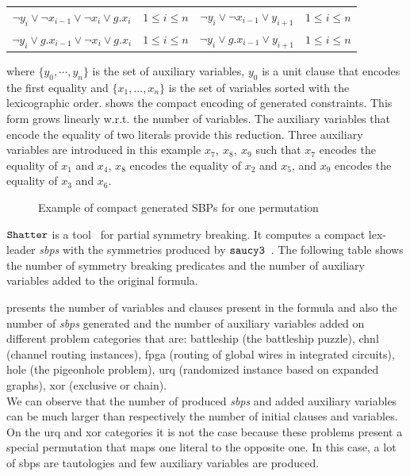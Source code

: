  
\begin{center}
\begin{tabular}{cc|cc}
 $\neg y_i \lor \neg x_{i-1} \lor \neg x_i \lor g.x_i$ & $1 \leq i \leq n$ & $ \neg y_i \lor \neg x_{i-1} \lor y_{i+1}$ & $1 \leq i \leq n$ \\
 $\neg y_i \lor  g.x_{i-1} \lor \neg x_i \lor g.x_i$ & $1 \leq i \leq n$ & $ \neg y_i \lor g.x_{i-1} \lor  y_{i+1}$ & $1 \leq i \leq n$ \\
 
\end{tabular}
\end{center}
where $\{y_0,\cdots, y_{n} \}$ is the set of auxiliary variables, $y_0$ is a unit clause that encodes the first equality and $\{x_1,...,x_n\}$ is the set of variables sorted with the lexicographic order.
 shows the compact encoding of generated constraints. This form grows linearly w.r.t. the number of variables.
The auxiliary variables that encode the equality of two literals provide this reduction. 
Three auxiliary variables are introduced in this example $x_7,\ x_8,\ x_9$ such that $x_7$ encodes the equality of $x_1$ and $x_4$, $x_8$ encodes the equality of $x_2$ and $x_5$, and $x_9$ encodes the equality of $x_3$ and $x_6$.
 \begin{figure}[!htbp]
 
 \caption{Example of compact generated SBPs for one permutation}
 \label{fig:esbp_compact_gen}
\end{figure}
$\texttt{Shatter}$ is a tool~\cite{aloul06} for partial symmetry breaking.
It computes a compact lex-leader \textit{sbps} with the symmetries produced by $\texttt{saucy3}$~\cite{katebi2010symmetry}.
The following table shows the number of symmetry breaking predicates and the
number of auxiliary variables added to the original formula.



 presents the number of variables and clauses present in the formula and also the  
number of \textit{sbps} generated and the number of auxiliary variables added on different problem categories that are:
battleship (the battleship puzzle), chnl (channel routing instances), fpga (routing of global wires in integrated circuits),
 hole (the pigeonhole problem), urq (randomized instance based on expanded graphs), xor (exclusive or chain).\\
We can observe that the number of produced \textit{sbps} and added auxiliary variables can be much larger than
respectively the number of initial clauses and variables. On the urq and xor categories it is not the case because
these problems present a special permutation that maps one literal to the opposite one. In this case, a lot of sbps
are tautologies and few auxiliary variables are produced.

